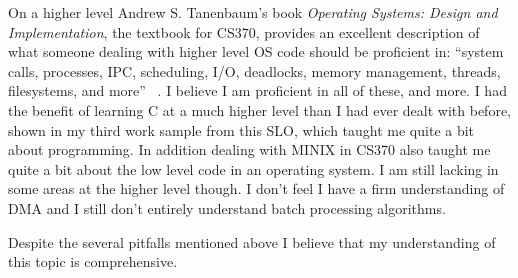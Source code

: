 On a higher level Andrew S. Tanenbaum's book \textit{Operating Systems: Design and Implementation}, the textbook for CS370, provides an excellent description of what someone dealing with higher level OS code should be proficient in: ``system calls, processes, IPC, scheduling, I/O, deadlocks, memory management, threads, filesystems, and more'' ~\cite{TanenbaumWoodhull08}. I believe I am proficient in all of these, and more. I had the benefit of learning C at a much higher level than I had ever dealt with before, shown in my third work sample from this SLO, which taught me quite a bit about programming. In addition dealing with MINIX in CS370 also taught me quite a bit about the low level code in an operating system. I am still lacking in some areas at the higher level though. I don't feel I have a firm understanding of DMA and I still don't entirely understand batch processing algorithms.

Despite the several pitfalls mentioned above I believe that my understanding of this topic is comprehensive.
